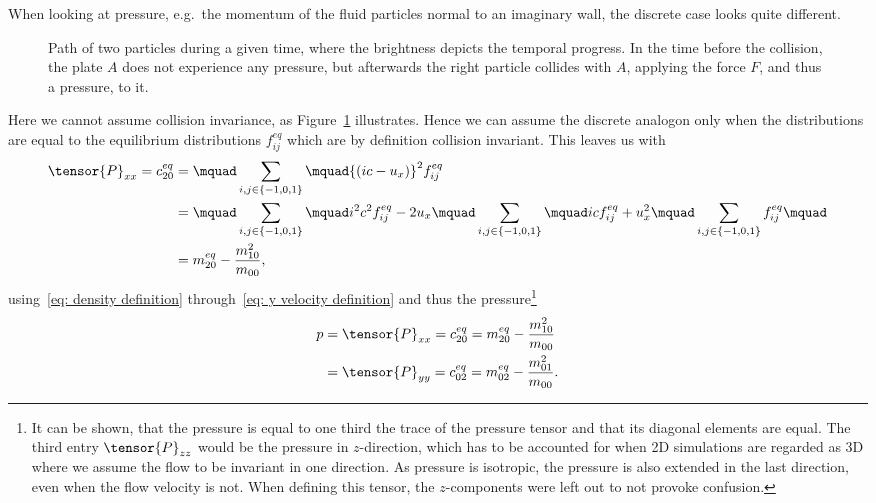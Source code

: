 When looking at pressure, e.g.\ the momentum of the fluid particles normal to an imaginary wall, the discrete case looks quite different.
\begin{figure}
\centering

\caption{Path of two particles during a given time, where the brightness depicts the temporal progress. In the time before the collision, the plate $A$ does not experience any pressure, but afterwards the right particle collides with $A$, applying the force $F$, and thus a pressure, to it.}
\label{fig: billard table}
\end{figure}
Here we cannot assume collision invariance, as Figure~\ref{fig: billard table} illustrates.
Hence we can assume the discrete analogon only when the distributions are equal to the equilibrium distributions $f_{ij}^{eq}$ which are by definition collision invariant.
This leaves us with
\begin{equation}
  \begin{aligned}
    \tensor{P}_{xx} = c_{20}^{eq}
    & = \mquad\sum_{i,j \in \{-1,0,1\}}\mquad  {(ic - u_x)}^2 f_{ij}^{eq}
    \\ & =
    \mquad\sum_{i,j \in \{-1,0,1\}}\mquad  i^2 c^2 f_{ij}^{eq} - 2 u_x \mquad \sum_{i,j \in \{-1,0,1\}}\mquad  ic f_{ij}^{eq} + u_x^2 \mquad\sum_{i,j \in \{-1,0,1\}} f_{ij}^{eq}\mquad
    \\ & = m_{20}^{eq} - \frac{m_{10}^2}{m_{00}},
  \end{aligned}
\end{equation}
using~\eqref{eq: density definition} through~\eqref{eq: y velocity definition} and thus the pressure\footnote{It can be shown, that the pressure is equal to one third the trace of the pressure tensor and that its diagonal elements are equal.
The third entry $\tensor{P}_{zz}$ would be the pressure in $z$-direction, which has to be accounted for when 2D simulations are regarded as 3D where we assume the flow to be invariant in one direction.
As pressure is isotropic, the pressure is also extended in the last direction, even when the flow velocity is not. When defining this tensor, the $z$-components were left out to not provoke confusion.}
\begin{equation}
  \label{eq: pressure}
  \begin{aligned}
    p &= \tensor{P}_{xx} =c_{20}^{eq}= m_{20}^{eq} - \frac{m_{10}^2}{m_{00}}\\
     &= \tensor{P}_{yy} =c_{02}^{eq} = m_{02}^{eq} - \frac{m_{01}^2}{m_{00}}.
  \end{aligned}
\end{equation}

